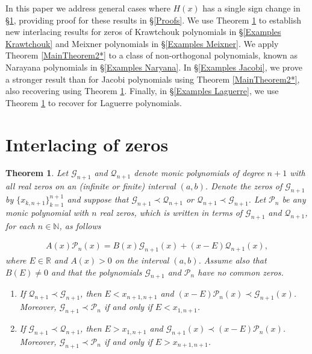 \documentclass[final,3p,times,12pt]{elsarticle}
\newtheorem{theorem}{Theorem}[section]
\numberwithin{equation}{section}  %
\begin{document}
In this paper we address general cases where $H(x)$ has a single sign change in \S \ref{main results}, providing proof for these results in \S \ref{Proofs}.  We use Theorem \ref{MainTheorem1} to establish new interlacing results for zeros of Krawtchouk polynomials in \S \ref{Examples Krawtchouk} and Meixner polynomials in \S \ref{Examples Meixner}. We apply Theorem \ref{MainTheorem2*} to a class of non-orthogonal polynomials, known as Narayana polynomials in \S \ref{Examples Naryana}. In \S \ref{Examples Jacobi}, we prove a stronger result than \cite[Theorem 3]{Arvesu-Driver-Littlejohn-RamanujanJ-2023} for Jacobi polynomials using Theorem \ref{MainTheorem2*}, also recovering \cite[Theorem 1]{Arvesu-Driver-Littlejohn-RamanujanJ-2023} using Theorem \ref{MainTheorem1}. Finally, in \S \ref{Examples Laguerre}, we use Theorem \ref{MainTheorem1} to recover \cite[Theorem 2.1]{Arvesu-Driver-Littlejohn-ITSF-2021} for Laguerre polynomials.

\section{Interlacing of zeros}\label{main results}

\begin{theorem}\label{MainTheorem1}
	Let $\mathcal{G}_{n+1}$ and $\mathcal{Q}_{n+1}$ denote monic polynomials of degree $n+1$ with all real zeros on an (infinite or finite) interval $(a,b)$. Denote the zeros of $\mathcal{G}_{n+1}$ by $\{x_{k,n+1}\}_{k=1}^{n+1}$ and suppose that $\mathcal{G}_{n+1}\prec \mathcal{Q}_{n+1}$ or $\mathcal{Q}_{n+1} \prec \mathcal{G}_{n+1}$. Let $\mathcal{P}_{n}$ be any monic polynomial with $n$ real zeros, which is written in terms of $\mathcal{G}_{n+1}$ and $\mathcal{Q}_{n+1}$, for each $n\in\mathbb{N}$, as follows 
	
	\begin{align}\label{GeneralMixedTTRR}
		A(x)\mathcal{P}_{n}(x)=B(x)\mathcal{G}_{n+1}(x)+(x-E)\mathcal{Q}_{n+1}(x),
	\end{align}
	where $E\in \mathbb{R}$ and $A(x)>0$ on the interval $(a,b)$. Assume also that $B(E)\neq0$ and that the polynomials $\mathcal{G}_{n+1}$ and $\mathcal{P}_{n}$ have no common zeros.
	\begin{enumerate}
		\item If $\mathcal{Q}_{n+1} \prec \mathcal{G}_{n+1}$, then $E<x_{n+1,n+1}$  and $(x-E)\mathcal{P}_n(x) \prec \mathcal{G}_{n+1}(x)$. Moreover, $\mathcal{G}_{n+1}\prec\mathcal{P}_n$  if and only if $E<x_{1,n+1}$.
		\item If $\mathcal{G}_{n+1}\prec \mathcal{Q}_{n+1}$, then  $E>x_{1,n+1}$ and $\mathcal{G}_{n+1}(x)\prec (x-E)\mathcal{P}_{n}(x)$. Moreover, $\mathcal{G}_{n+1}\prec\mathcal{P}_n$ if and only if $E>x_{n+1,n+1}$. 
	\end{enumerate}
	
\end{theorem}
\end{document}
